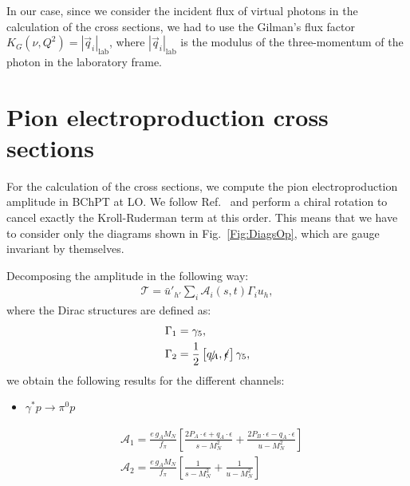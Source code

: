 \documentclass[twocolumn,prc,showpacs,nofootinbib,preprintnumbers,amsmath,amssymb,superscriptaddress]{revtex4-1}
\begin{document}
In our case, since we consider the incident flux of virtual photons in the calculation of the cross sections, we had to use the Gilman's flux factor $K_G(\nu,Q^2)=|\vec{q}_i|_\mathrm{lab}$, where  $|\vec{q}_i|_\mathrm{lab}$ is the modulus of the three-momentum of the photon in the laboratory frame.




\section{Pion electroproduction cross sections}\label{App:CrossSections}

For the calculation of the cross sections, we compute the pion electroproduction amplitude in BChPT at LO.
We follow Ref.~\cite{Holstein:2005db,Lensky:2009uv} and perform a chiral rotation to cancel exactly the Kroll-Ruderman term at this order.
This means that we have to consider only the diagrams shown in Fig.~\ref{Fig:DiagsOp}, which are gauge invariant by themselves.

Decomposing the amplitude in the following way:
\begin{align}\label{Eq:T-decomposition}
\mathcal{T}= \bar{u}'_{h'} \sum_{i}  \mathcal{A}_i (s,t) \Gamma_i u_h,
\end{align}
where the Dirac structures are defined as:
\begin{align}\label{Eq:DefGammas}
  \Gamma_1&= \gamma_5, \\
  \Gamma_2&= \frac{1}{2}\left[\slashed{q_A},\slashed{\epsilon}\right]\gamma_5,  
\end{align}
we obtain the following results for the different channels:
\begin{itemize}
 \item $\gamma^* p \to \pi^0 p$
\end{itemize}
\begin{align}
  &\mathcal{A}_1= \frac{e\, g_A M_N}{f_\pi}\left[\frac{2 P_A\cdot \epsilon + q_A\cdot \epsilon}{s-M_N^2} + \frac{2 P_B\cdot \epsilon - q_A\cdot \epsilon}{u-M_N^2}\right] \\
   &\mathcal{A}_2=\frac{e\, g_A M_N}{f_\pi}\left[\frac{1}{s-M_N^2} + \frac{1}{u-M_N^2}\right]
\end{align}
\end{document}
